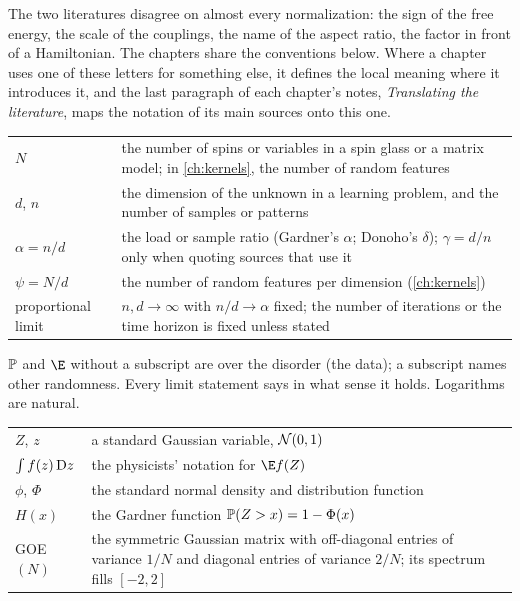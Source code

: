 
The two literatures disagree on almost every normalization: the sign of the free energy, the scale of the couplings, the name of the aspect ratio, the factor in front of a Hamiltonian. The chapters share the conventions below. Where a chapter uses one of these letters for something else, it defines the local meaning where it introduces it, and the last paragraph of each chapter's notes, \emph{Translating the literature}, maps the notation of its main sources onto this one.


\begin{tabular}{@{}p{}p{}@{}}
$N$ & the number of spins or variables in a spin glass or a matrix model; in \cref{ch:kernels}, the number of random features \\
$d$, $n$ & the dimension of the unknown in a learning problem, and the number of samples or patterns \\
$\alpha=n/d$ & the load or sample ratio (Gardner's $\alpha$; Donoho's $\delta$); $\gamma=d/n$ only when quoting sources that use it \\
$\psi=N/d$ & the number of random features per dimension (\cref{ch:kernels}) \\
proportional limit & $n,d\to\infty$ with $n/d\to\alpha$ fixed; the number of iterations or the time horizon is fixed unless stated
\end{tabular}

\noindent $\mathbb{P}$ and $\E$ without a subscript are over the disorder (the data); a subscript names other randomness. Every limit statement says in what sense it holds. Logarithms are natural.


\begin{tabular}{@{}p{}p{}@{}}
$Z$, $z$ & a standard Gaussian variable, $\mathcal{N}(0,1)$ \\
$\int f(z)\,\mathrm{D}z$ & the physicists' notation for $\E f(Z)$ \\
$\phi$, $\Phi$ & the standard normal density and distribution function \\
$H(x)$ & the Gardner function $\mathbb{P}(Z>x)=1-\Phi(x)$ \\
GOE$(N)$ & the symmetric Gaussian matrix with off-diagonal entries of variance $1/N$ and diagonal entries of variance $2/N$; its spectrum fills $[-2,2]$
\end{tabular}


